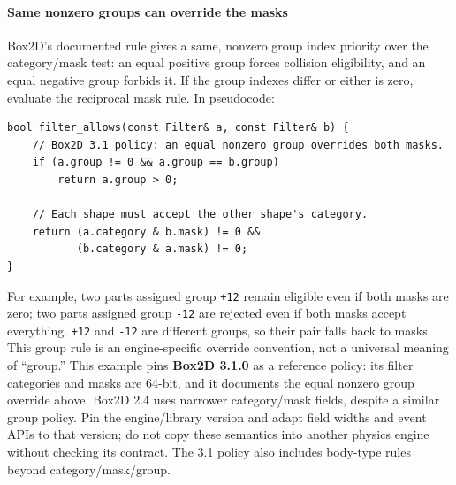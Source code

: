\paragraph{Same nonzero groups can override the masks}\label{same-nonzero-groups-can-override-the-masks}

Box2D's documented rule gives a same, nonzero group index priority over the category/mask test: an equal positive group forces collision eligibility, and an equal negative group forbids it. If the group indexes differ or either is zero, evaluate the reciprocal mask rule. In pseudocode:

\begin{verbatim}
bool filter_allows(const Filter& a, const Filter& b) {
    // Box2D 3.1 policy: an equal nonzero group overrides both masks.
    if (a.group != 0 && a.group == b.group)
        return a.group > 0;

    // Each shape must accept the other shape's category.
    return (a.category & b.mask) != 0 &&
           (b.category & a.mask) != 0;
}
\end{verbatim}

For example, two parts assigned group \texttt{+12} remain eligible even if both masks are zero; two parts assigned group \texttt{-12} are rejected even if both masks accept everything. \texttt{+12} and \texttt{-12} are different groups, so their pair falls back to masks. This group rule is an engine-specific override convention, not a universal meaning of ``group.'' This example pins \textbf{Box2D 3.1.0} as a reference policy: its filter categories and masks are 64-bit, and it documents the equal nonzero group override above. Box2D 2.4 uses narrower category/mask fields, despite a similar group policy. Pin the engine/library version and adapt field widths and event APIs to that version; do not copy these semantics into another physics engine without checking its contract. The 3.1 policy also includes body-type rules beyond category/mask/group.

